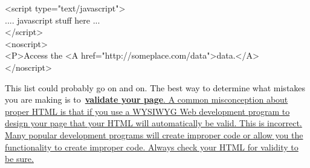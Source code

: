 \documentclass[12pt]{report}
\renewcommand{\_}{\kern-1.5pt\textunderscore\kern-1.5pt}
\begin{document}
\begin{adjustwidth}{0.2in}{0.84in}
\textcolor[HTML]{0D0D0D}{<script type="text/javascript">\\
.... javascript stuff here ...\\
</script>\\
<noscript>\\
<P>Access the <A href="http://someplace.com/data">data.</A>\\
</noscript>}\par

\end{adjustwidth}

\begin{adjustwidth}{0.2in}{0.84in}
\textcolor[HTML]{0D0D0D}{This list could probably go on and on. The best way to determine what mistakes you are making is to \href{http://validator.w3.org/}{\textbf{validate your page}. A common misconception about proper HTML is that if you use a WYSIWYG Web development program to design your page that your HTML will automatically be valid. This is incorrect. Many popular development programs will create improper code or allow you the functionality to create improper code. Always check your HTML for validity to be sure.}}\par

\end{adjustwidth}


\vspace{\baselineskip}

\vspace{\baselineskip}

\vspace{\baselineskip}

\vspace{\baselineskip}

\vspace{\baselineskip}

\vspace{\baselineskip}

\vspace{\baselineskip}

\vspace{\baselineskip}

\vspace{\baselineskip}

\vspace{\baselineskip}

\vspace{\baselineskip}

\vspace{\baselineskip}
\end{document}

